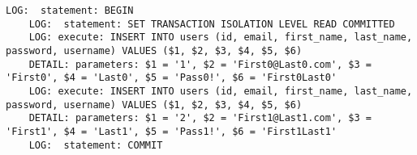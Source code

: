 \begin{lstlisting}[caption={Log of ASP.NET initial user population creation},breaklines=true,label={lst:aspnetPopulateLog}]
    LOG:  statement: BEGIN
    LOG:  statement: SET TRANSACTION ISOLATION LEVEL READ COMMITTED
    LOG: execute: INSERT INTO users (id, email, first_name, last_name, password, username) VALUES ($1, $2, $3, $4, $5, $6)
    DETAIL: parameters: $1 = '1', $2 = 'First0@Last0.com', $3 = 'First0', $4 = 'Last0', $5 = 'Pass0!', $6 = 'First0Last0'
    LOG: execute: INSERT INTO users (id, email, first_name, last_name, password, username) VALUES ($1, $2, $3, $4, $5, $6)
    DETAIL: parameters: $1 = '2', $2 = 'First1@Last1.com', $3 = 'First1', $4 = 'Last1', $5 = 'Pass1!', $6 = 'First1Last1'
    LOG:  statement: COMMIT
\end{lstlisting}
